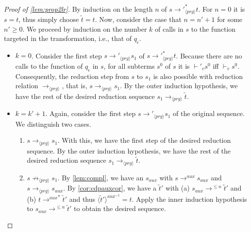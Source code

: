 \begin{proof}[Proof of \autoref{lem:prop2lr}]

By induction on the length $n$ of $s {\longrightarrow'}_{\langle prg \rangle}^* t$. For $n = 0$ it is $s = t$, thus simply choose $\widetilde{t} = t$. Now, consider the case that $n = n'+1$ for some $n' \geq 0$. We proceed by induction on the number $k$ of calls in $s$ to the function targeted in the transformation, i.e., that of $q_\epsilon$.

\begin{itemize}
\item $k = 0$. Consider the first step $s {\longrightarrow'}_{\langle prg \rangle} s_1$ of $s {\longrightarrow'}_{\langle prg \rangle}^* t$. Because there are no calls to the function of $q_\epsilon$ in $s$, for all subterms $s^0$ of $s$ it is $\vdash'_v s^0$ iff $\vdash_v s^0$. Consequently, the reduction step from $s$ to $s_1$ is also possible with reduction relation $\longrightarrow_{\langle prg \rangle}$, that is, $s \longrightarrow_{\langle prg \rangle} s_1$. By the outer induction hypothesis, we have the rest of the desired reduction sequence $s_1 \longrightarrow_{\langle prg \rangle} \widetilde{t}$.

\item $k = k' + 1$. Again, consider the first step $s {\longrightarrow'}_{\langle prg \rangle} s_1$ of the original sequence. We distinguish two cases.
\begin{enumerate}
\item $s \longrightarrow_{\langle prg \rangle} s_1$. With this, we have the first step of the desired reduction sequence. By the outer induction hypothesis, we have the rest of the desired reduction sequence $s_1 \longrightarrow_{\langle prg \rangle} \widetilde{t}$.

\item $s \not\longrightarrow_{\langle prg \rangle} s_1$. By \autoref{lem:compl}, we have an $s_{aux}$ with $s \longrightarrow^{aux} s_{aux}$ and $s \longrightarrow_{\langle prg \rangle} s_{aux}$. By \autoref{cor:cdpauxcor}, we have a $\widetilde{t}'$ with (a) $s_{aux} \longrightarrow^{\leq n} \widetilde{t}'$ and (b) $t {\longrightarrow^{aux}}^* \widetilde{t}'$ and thus $\langle \widetilde{t}' \rangle^{aux^{-1}} = t$. Apply the inner induction hypothesis to $s_{aux} \longrightarrow^{\leq n} \widetilde{t}'$ to obtain the desired sequence.
\end{enumerate}
\end{itemize}

\end{proof}

